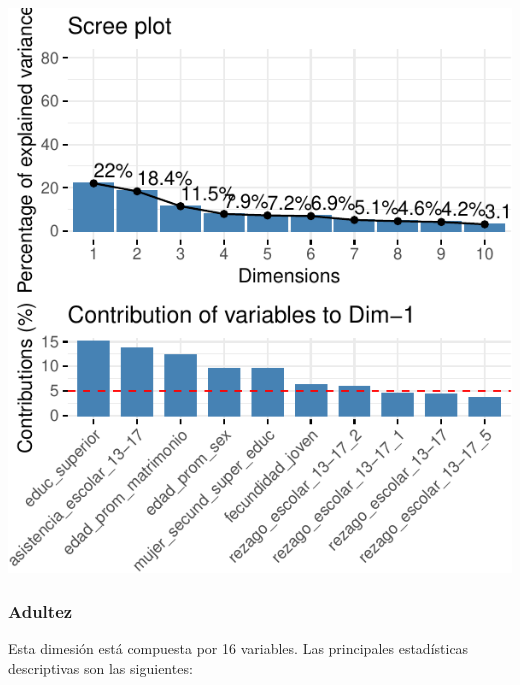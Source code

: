 \includegraphics{Anexo_PCA_files/figure-latex/unnamed-chunk-1-9.pdf}

\hypertarget{adultez}{%
\subsubsection{Adultez}\label{adultez}}

Esta dimesión está compuesta por 16 variables. Las principales
estadísticas descriptivas son las siguientes:

